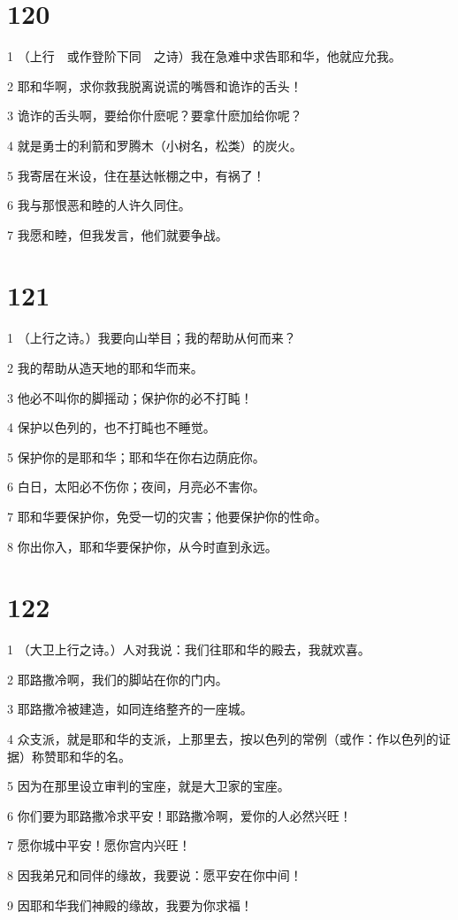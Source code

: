 \chapter{120}

\par 1 （上行　或作登阶下同　之诗）我在急难中求告耶和华，他就应允我。
\par 2 耶和华啊，求你救我脱离说谎的嘴唇和诡诈的舌头！
\par 3 诡诈的舌头啊，要给你什麽呢？要拿什麽加给你呢？
\par 4 就是勇士的利箭和罗腾木（小树名，松类）的炭火。
\par 5 我寄居在米设，住在基达帐棚之中，有祸了！
\par 6 我与那恨恶和睦的人许久同住。
\par 7 我愿和睦，但我发言，他们就要争战。

\chapter{121}

\par 1 （上行之诗。）我要向山举目；我的帮助从何而来？
\par 2 我的帮助从造天地的耶和华而来。
\par 3 他必不叫你的脚摇动；保护你的必不打盹！
\par 4 保护以色列的，也不打盹也不睡觉。
\par 5 保护你的是耶和华；耶和华在你右边荫庇你。
\par 6 白日，太阳必不伤你；夜间，月亮必不害你。
\par 7 耶和华要保护你，免受一切的灾害；他要保护你的性命。
\par 8 你出你入，耶和华要保护你，从今时直到永远。

\chapter{122}

\par 1 （大卫上行之诗。）人对我说：我们往耶和华的殿去，我就欢喜。
\par 2 耶路撒冷啊，我们的脚站在你的门内。
\par 3 耶路撒冷被建造，如同连络整齐的一座城。
\par 4 众支派，就是耶和华的支派，上那里去，按以色列的常例（或作：作以色列的证据）称赞耶和华的名。
\par 5 因为在那里设立审判的宝座，就是大卫家的宝座。
\par 6 你们要为耶路撒冷求平安！耶路撒冷啊，爱你的人必然兴旺！
\par 7 愿你城中平安！愿你宫内兴旺！
\par 8 因我弟兄和同伴的缘故，我要说：愿平安在你中间！
\par 9 因耶和华我们神殿的缘故，我要为你求福！


